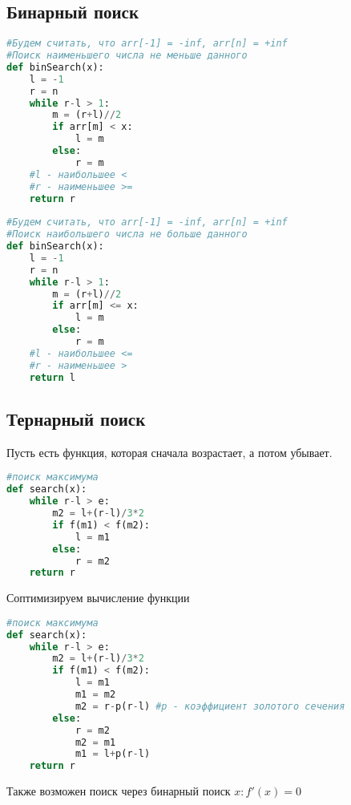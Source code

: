 \documentclass[12pt]{article}
\begin{document}
\subsection{Бинарный поиск}
\begin{lstlisting}[language=Python]
#Будем считать, что arr[-1] = -inf, arr[n] = +inf
#Поиск наименьшего числа не меньше данного
def binSearch(x):
    l = -1
    r = n
    while r-l > 1:
        m = (r+l)//2
        if arr[m] < x:
            l = m
        else:
            r = m
    #l - наибольшее <
    #r - наименьшее >=
    return r
    
#Будем считать, что arr[-1] = -inf, arr[n] = +inf
#Поиск наибольшего числа не больше данного
def binSearch(x):
    l = -1
    r = n
    while r-l > 1:
        m = (r+l)//2
        if arr[m] <= x:
            l = m
        else:
            r = m
    #l - наибольшее <=
    #r - наименьшее >
    return l
\end{lstlisting}
\subsection{Тернарный поиск}
Пусть есть функция, которая сначала возрастает, а потом убывает.
\begin{lstlisting}[language=Python]
#поиск максимума
def search(x):
    while r-l > e:
        m2 = l+(r-l)/3*2
        if f(m1) < f(m2):
            l = m1
        else:
            r = m2
    return r
\end{lstlisting}
Соптимизируем вычисление функции
\begin{lstlisting}[language=Python]
#поиск максимума
def search(x):
    while r-l > e:
        m2 = l+(r-l)/3*2
        if f(m1) < f(m2):
            l = m1
            m1 = m2
            m2 = r-p(r-l) #p - коэффициент золотого сечения
        else:
            r = m2
            m2 = m1
            m1 = l+p(r-l)
    return r
\end{lstlisting}
Также возможен поиск через бинарный поиск $x: f'(x)=0$
\end{document}
